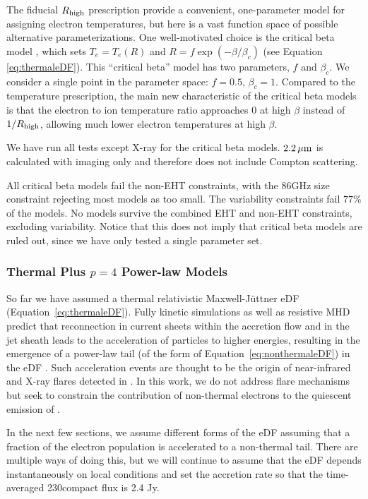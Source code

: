 The fiducial $R_\mathrm{high}$ prescription provide a convenient, one-parameter model for assigning electron temperatures, but here is a vast function space of possible alternative parameterizations.
One well-motivated choice is the critical beta model \citep{2020MNRAS.493.1404A}, which sets $T_e = T_e(R)$ and $R = f \exp(-\beta/\beta_c)$ (see Equation \ref{eq:thermaleDF}).
This ``critical beta'' model has two parameters, $f$ and $\beta_c$.
We consider a single point in the parameter space: $f = 0.5$, $\beta_c = 1$.
Compared to the \Rh temperature prescription, the main new characteristic of the critical beta models is that the electron to ion temperature ratio approaches 0 at high $\beta$ instead of $1/R_\mathrm{high}$, allowing much lower electron temperatures at high $\beta$.

We have run all tests except X-ray for the critical beta models.
$2.2\,\mu\mathrm{m}$ is calculated with imaging only and therefore does not include Compton scattering.

All critical beta models fail the non-EHT constraints, with the 86GHz size constraint rejecting most models as too small.
The variability constraints fail $77\%$ of the models.
No models survive the combined EHT and non-EHT constraints, excluding variability.
Notice that this does not imply that critical beta models are ruled out, since we have only tested a single parameter set.

\subsubsection{Thermal Plus \texorpdfstring{$p = 4$}{p=4} Power-law Models}

So far we have assumed a thermal relativistic Maxwell-J{\"u}ttner eDF (Equation~\ref{eq:thermaleDF}).
Fully kinetic simulations as well as resistive MHD predict that reconnection in current sheets within the accretion flow and in the jet sheath leads to the acceleration of particles to higher energies, resulting in the emergence of a power-law tail (of the form of Equation~\ref{eq:nonthermaleDF}) in the eDF \citep[e.g.,][and references therein]{Sironi2021}.
Such acceleration events are thought to be the origin of near-infrared and X-ray flares detected in \sgra.
In this work, we do not address flare mechanisms but seek to constrain the contribution of non-thermal electrons to the quiescent emission of \sgra.

In the next few sections, we assume different forms of the eDF assuming that a fraction of the electron population is accelerated to a non-thermal tail.
There are multiple ways of doing this, but we will continue to assume that the eDF depends instantaneously on local conditions and set the accretion rate so that the time-averaged 230\GHz compact flux is 2.4 Jy.

